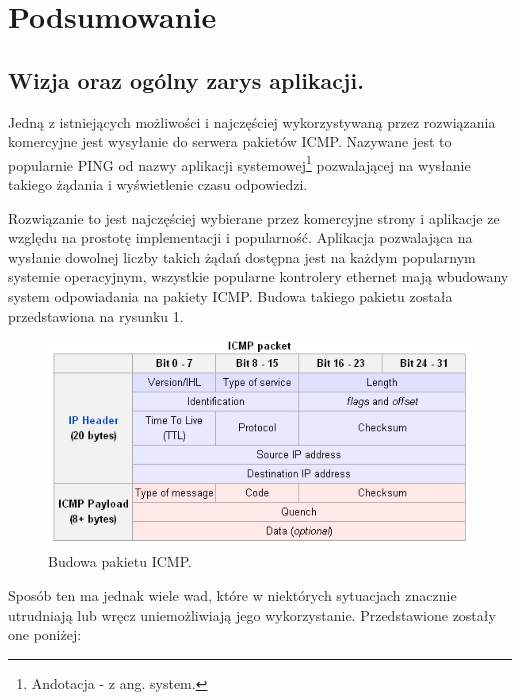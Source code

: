 \chapter[Podsumowanie]{Podsumowanie}

\section{Wizja oraz ogólny zarys aplikacji.}

Jedną z istniejących możliwości i najczęściej wykorzystywaną przez rozwiązania komercyjne jest wysyłanie do serwera pakietów ICMP. Nazywane jest to popularnie PING od nazwy aplikacji systemowej\footnote{Andotacja - z ang. system.} pozwalającej na wysłanie takiego żądania i wyświetlenie czasu odpowiedzi.

Rozwiązanie to jest najczęściej wybierane przez komercyjne strony i aplikacje ze względu na prostotę implementacji i popularność. Aplikacja pozwalająca na wysłanie dowolnej liczby takich żądań dostępna jest na każdym popularnym systemie operacyjnym, wszystkie popularne kontrolery ethernet mają wbudowany system odpowiadania na pakiety ICMP. Budowa takiego pakietu została przedstawiona na rysunku 1. 

\begin{figure}[H]
	\centering
	\includegraphics[width=\textwidth, bb = 0px 0px 535px 262px, keepaspectratio=true]{grafika/icmp_packet.jpg} 
	\caption{ Budowa pakietu ICMP. }
\end{figure}

Sposób ten ma jednak wiele wad, które w niektórych sytuacjach znacznie utrudniają lub wręcz uniemożliwiają jego wykorzystanie. Przedstawione zostały one poniżej:

